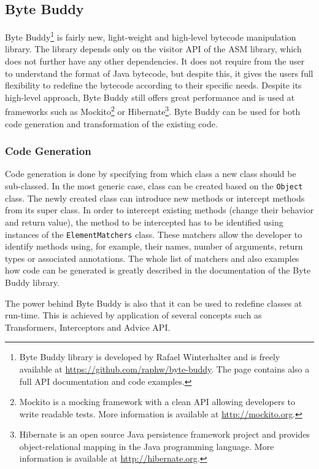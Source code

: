 \subsection{Byte Buddy}
\label{sec:byte_buddy}
Byte Buddy\footnote{Byte Buddy library is developed by Rafael Winterhalter and is freely available at \url{https://github.com/raphw/byte-buddy}. The page contains also a full API documentation and code examples.} is fairly new, light-weight and high-level bytecode manipulation library. The library depends only on the visitor API of the ASM library, which does not further have any other dependencies. It does not require from the user to understand the format of Java bytecode, but despite this, it gives the users full flexibility to redefine the bytecode according to their specific needs. Despite its high-level approach, Byte Buddy still offers great performance \cite{ByteBuddy_Perf} and is used at frameworks such as Mockito\footnote{Mockito is a mocking framework with a clean API allowing developers to write readable tests. More information is available at \url{http://mockito.org}.} or Hibernate\footnote{Hibernate is an open source Java persistence framework project and provides object-relational mapping in the Java programming language. More information is available at \url{http://hibernate.org}.}. Byte Buddy can be used for both code generation and transformation of the existing code.

\subsubsection{Code Generation}
Code generation is done by specifying from which class a new class should be sub-classed. In the most generic case, class can be created based on the \texttt{Object} class. The newly created class can introduce new methods or intercept methods from its super class. In order to intercept existing methods (change their behavior and return value), the method to be intercepted has to be identified using instances of the \texttt{ElementMatchers} class. These matchers allow the developer to identify methods using, for example, their names, number of arguments, return types or associated annotations. The whole list of matchers and also examples how code can be generated is greatly described in the documentation of the Byte Buddy library.

The power behind Byte Buddy is also that it can be used to redefine classes at run-time. This is achieved by application of several concepts such as Transformers, Interceptors and Advice API.
